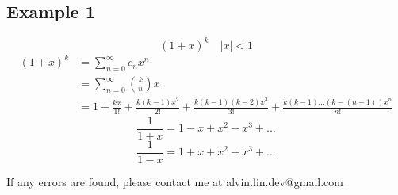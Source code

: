 \documentclass[letterpaper, 12pt]{article}
\begin{document}
\subsection*{Example 1}
\[ (1+x)^{k} \quad |x| < 1 \]
\begin{align*}
  (1+x)^{k} &= \sum_{n=0}^{\infty}c_{n}x^{n} \\
  &= \sum_{n=0}^{\infty}\binom{k}{n}x \\
  &= 1+\frac{kx}{1!}+\frac{k(k-1)x^{2}}{2!}+\frac{k(k-1)(k-2)x^{3}}{3!}
    +\frac{k(k-1)...(k-(n-1))x^{n}}{n!}
\end{align*}
\[ \frac{1}{1+x} = 1-x+x^{2}-x^{3}+... \]
\[ \frac{1}{1-x} = 1+x+x^{2}+x^{3}+... \]

\begin{center}
  If any errors are found, please contact me at alvin.lin.dev@gmail.com
\end{center}
\end{document}
